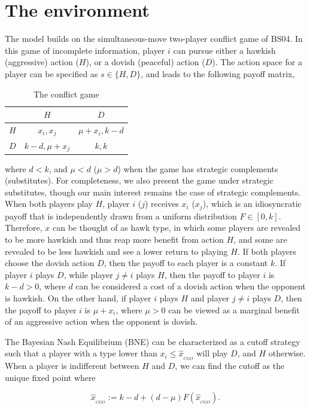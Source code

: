 \documentclass[12pt, letterpaper]{article}
\theoremstyle{plain}
\begin{document}
\section{The environment}
\label{sec:model}
The model builds on the simultaneous-move two-player conflict game of BS04. In this game of incomplete information, player $i$ can pursue either a hawkish (aggressive) action ($H$), or a dovish (peaceful) action ($D$). The action space for a player can be specified as $s\in\{H,D\}$, and leads to the following payoff matrix,

\begin{table}[h]
\centering
\caption{The conflict game}
\label{table:payoff}
\begin{tabular}{c|cc}
    & $H$ & $D$ \\ \hline
$H$ & $x_i, x_j$    & $\mu+x_i, k-d$     \\
$D$ &  $k-d, \mu+x_j$   & $k,k$
\end{tabular}
\end{table}
where $d<k$, and $\mu<d$ ($\mu > d$) when the game has strategic complements (substitutes). For completeness, we also present the game under strategic substitutes, though our main interest remains the case of strategic complements. When both players play $H$, player $i$ ($j$) receives $x_i$ ($x_j$), which is an idiosyncratic payoff that is independently drawn from a uniform distribution $F\in [0,k]$. Therefore, $x$ can be thought of as hawk type, in which some players are revealed to be more hawkish and thus reap more benefit from action $H$, and some are revealed to be less hawkish and see a lower return to playing $H$. If both players choose the dovish action $D$, then the payoff to each player is a constant $k$. If player $i$ plays $D$, while player $j\neq i$ plays $H$, then the payoff to player $i$ is $k-d>0$, where $d$ can be considered a cost of a dovish action when the opponent is hawkish. On the other hand, if player $i$ plays $H$ and player $j\neq i$ plays $D$, then the payoff to player $i$ is $\mu+x_i$, where $\mu>0$ can be viewed as a marginal benefit of an aggressive action when the opponent is dovish. 

The Bayesian Nash Equilibrium (BNE) can be characterized as a cutoff strategy such that a player with a type lower than $x_i\leq\hat{x}_{_{CGO}}$ will play $D$, and $H$ otherwise.  When a player is indifferent between $H$ and $D$, we can find the cutoff as the unique fixed point where 

\begin{equation}
\hat{x}_{_{CGO}}:= k-d + (d-\mu) F(\hat{x}_{_{CGO}}). \label{eq:cgo}
\end{equation}
\end{document}
